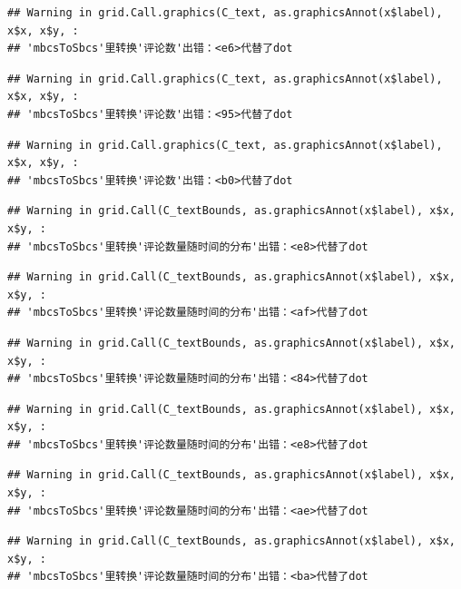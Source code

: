 \documentclass[
]{article}
\begin{document}
\begin{verbatim}
## Warning in grid.Call.graphics(C_text, as.graphicsAnnot(x$label), x$x, x$y, :
## 'mbcsToSbcs'里转换'评论数'出错：<e6>代替了dot
\end{verbatim}

\begin{verbatim}
## Warning in grid.Call.graphics(C_text, as.graphicsAnnot(x$label), x$x, x$y, :
## 'mbcsToSbcs'里转换'评论数'出错：<95>代替了dot
\end{verbatim}

\begin{verbatim}
## Warning in grid.Call.graphics(C_text, as.graphicsAnnot(x$label), x$x, x$y, :
## 'mbcsToSbcs'里转换'评论数'出错：<b0>代替了dot
\end{verbatim}

\begin{verbatim}
## Warning in grid.Call(C_textBounds, as.graphicsAnnot(x$label), x$x, x$y, :
## 'mbcsToSbcs'里转换'评论数量随时间的分布'出错：<e8>代替了dot
\end{verbatim}

\begin{verbatim}
## Warning in grid.Call(C_textBounds, as.graphicsAnnot(x$label), x$x, x$y, :
## 'mbcsToSbcs'里转换'评论数量随时间的分布'出错：<af>代替了dot
\end{verbatim}

\begin{verbatim}
## Warning in grid.Call(C_textBounds, as.graphicsAnnot(x$label), x$x, x$y, :
## 'mbcsToSbcs'里转换'评论数量随时间的分布'出错：<84>代替了dot
\end{verbatim}

\begin{verbatim}
## Warning in grid.Call(C_textBounds, as.graphicsAnnot(x$label), x$x, x$y, :
## 'mbcsToSbcs'里转换'评论数量随时间的分布'出错：<e8>代替了dot
\end{verbatim}

\begin{verbatim}
## Warning in grid.Call(C_textBounds, as.graphicsAnnot(x$label), x$x, x$y, :
## 'mbcsToSbcs'里转换'评论数量随时间的分布'出错：<ae>代替了dot
\end{verbatim}

\begin{verbatim}
## Warning in grid.Call(C_textBounds, as.graphicsAnnot(x$label), x$x, x$y, :
## 'mbcsToSbcs'里转换'评论数量随时间的分布'出错：<ba>代替了dot
\end{verbatim}
\end{document}
